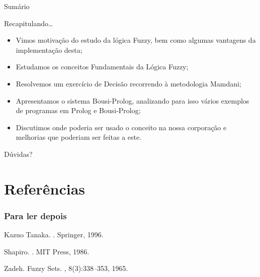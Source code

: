 \documentclass[portuges]{beamer}
\begin{document}
\begin{frame}{Sumário}
\begin{block}{Recapitulando\ldots}
	\begin{itemize}[<+->]
		\item Vimos motivação do estudo da lógica Fuzzy, bem como
		algumas vantagens da implementação desta;
		\item Estudamos os conceitos Fundamentais da Lógica Fuzzy;
		\item Resolvemos um exercício de Decisão recorrendo 
		à metodologia Mamdani;
		\item Apresentamos o sistema Bousi-Prolog, analizando para
		isso vários exemplos de programas em Prolog e Bousi-Prolog;
		\item Discutimos onde poderia ser usado o conceito na
		nossa corporação e melhorias que poderiam ser feitas a este. 
	\end{itemize}
\end{block}
\end{frame}

\begin{frame}{Dúvidas?}
		\begin{figure}
			\centering
		\end{figure}		
\end{frame}


\section*{Referências}

\begin{frame}[allowframebreaks]
  \frametitle<presentation>{Para ler depois}
    
  \begin{thebibliography}{10}
    
  \beamertemplatebookbibitems
    Kazuo Tanaka.
    .
    \newblock Springer, 1996.

    Shapiro.
    .
    \newblock MIT Press, 1986.
 
  \beamertemplatearticlebibitems

    Zadeh.
    \newblock Fuzzy Sets.
    , 8(3):338--353,
    1965.
  \end{thebibliography}
\end{frame}
\end{document}
